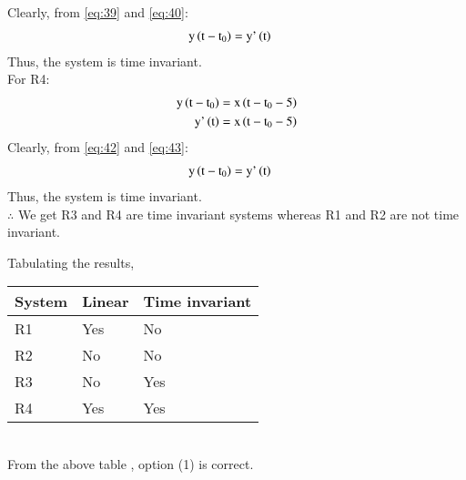 \documentclass[journal,12pt,twocolumn]{IEEEtran}
\begin{document}
Clearly, from \eqref{eq:39} and \eqref{eq:40}:
\begin{align}
\label{eq:41}
    \text{y}\left(\text{t}-\text{t}_{0}\right) ={}& \text{y'}\left(\text{t}\right)
\end{align}
Thus, the system is time invariant.\\
For R4:
\begin{align}
\label{eq:42}
 \text{y}\left(\text{t}-\text{t}_{0}\right) ={}& \text{x}\left(\text{t}-\text{t}_{0}-5\right)\\
 \label{eq:43}
  \text{y'}\left(\text{t}\right)={}& \text{x}\left(\text{t}-\text{t}_{0}-5\right)
\end{align}
Clearly, from \eqref{eq:42} and \eqref{eq:43}:
\begin{align}
\label{eq:44}
    \text{y}\left(\text{t}-\text{t}_{0}\right) ={}& \text{y'}\left(\text{t}\right)
\end{align}
Thus, the system is time invariant.\\

$\therefore$ We get R3 and R4 are time invariant systems whereas R1 and R2 are not time invariant. 

Tabulating the results,
\\
\begin{table}[h]
\label{table:questions}
\begin{tabular}{ |m{1.5cm}|m{2cm}|m{2.5cm}| } 
 \hline
 System & Linear & Time invariant \\ 
 \hline
R1 & Yes & No\\[1ex]
 \hline
 R2 & No & No\\[1ex]
 \hline
 R3 & No & Yes\\[1ex]
 \hline
 R4 & Yes & Yes\\[1ex]
 \hline
\end{tabular}

\end{table}\\
From the above table , option (1) is correct.
\end{document}
